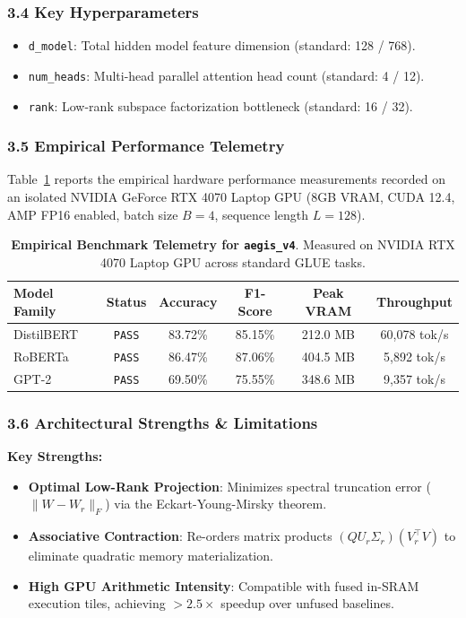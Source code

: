 \subsubsection*{3.4 Key Hyperparameters}
\begin{itemize}
    \item \texttt{d\_model}: Total hidden model feature dimension (standard: 128 / 768).
    \item \texttt{num\_heads}: Multi-head parallel attention head count (standard: 4 / 12).
    \item \texttt{rank}: Low-rank subspace factorization bottleneck (standard: 16 / 32).
\end{itemize}

\subsubsection*{3.5 Empirical Performance Telemetry}
Table~\ref{tab:telemetry_aegis_v4} reports the empirical hardware performance measurements recorded on an isolated NVIDIA GeForce RTX 4070 Laptop GPU (8GB VRAM, CUDA 12.4, AMP FP16 enabled, batch size $B=4$, sequence length $L=128$).

\begin{table}[h]
\centering
\small
\caption{\textbf{Empirical Benchmark Telemetry for \texttt{aegis\_v4}}. Measured on NVIDIA RTX 4070 Laptop GPU across standard GLUE tasks.}
\label{tab:telemetry_aegis_v4}
\begin{tabular*}{\columnwidth}{@{\extracolsep{\fill}}lccccc}
\toprule
\textbf{Model Family} & \textbf{Status} & \textbf{Accuracy} & \textbf{F1-Score} & \textbf{Peak VRAM} & \textbf{Throughput} \\
\midrule
DistilBERT & \texttt{PASS} & 83.72\% & 85.15\% & 212.0 MB & 60,078 tok/s \\
RoBERTa    & \texttt{PASS} & 86.47\% & 87.06\% & 404.5 MB & 5,892 tok/s \\
GPT-2      & \texttt{PASS} & 69.50\% & 75.55\% & 348.6 MB & 9,357 tok/s \\
\bottomrule
\end{tabular*}
\end{table}

\subsubsection*{3.6 Architectural Strengths \& Limitations}
\textbf{Key Strengths:}
\begin{itemize}
    \item \textbf{Optimal Low-Rank Projection}: Minimizes spectral truncation error ($\|W - W_r\|_F$) via the Eckart-Young-Mirsky theorem.
    \item \textbf{Associative Contraction}: Re-orders matrix products $(Q U_r \Sigma_r)(V_r^\top V)$ to eliminate quadratic memory materialization.
    \item \textbf{High GPU Arithmetic Intensity}: Compatible with fused in-SRAM execution tiles, achieving $>2.5\times$ speedup over unfused baselines.
\end{itemize}

